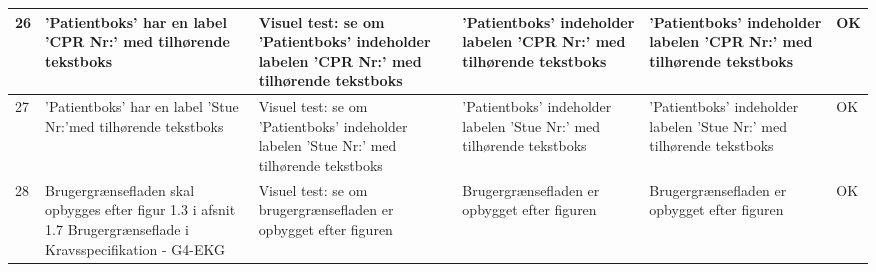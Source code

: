 \begin{table}[H]
\begin{tabular}{|p{0.5cm}|p{4cm}|p{3cm}|p{3cm}|p{3cm}|p{1cm}|}
\hline
 26 & 'Patientboks' har en label 'CPR Nr:' med tilhørende tekstboks & Visuel test: se om 'Patientboks' indeholder labelen 'CPR Nr:' med tilhørende tekstboks  & 'Patientboks' indeholder labelen 'CPR Nr:' med tilhørende tekstboks & 'Patientboks' indeholder labelen 'CPR Nr:' med tilhørende tekstboks & OK \\\hline
 27 & 'Patientboks' har en label 'Stue Nr:'med tilhørende tekstboks & Visuel test: se om 'Patientboks' indeholder labelen 'Stue Nr:' med tilhørende tekstboks & 'Patientboks' indeholder labelen 'Stue Nr:' med tilhørende tekstboks & 'Patientboks' indeholder labelen 'Stue Nr:' med tilhørende tekstboks & OK \\\hline
  28 & Brugergrænsefladen skal opbygges efter figur 1.3 i afsnit 1.7 Brugergrænseflade i Kravsspecifikation - G4-EKG & Visuel test: se om brugergrænsefladen er opbygget efter figuren & Brugergrænsefladen er opbygget efter figuren &Brugergrænsefladen er opbygget efter figuren & OK \\\hline
\end{tabular}
\end{table}

